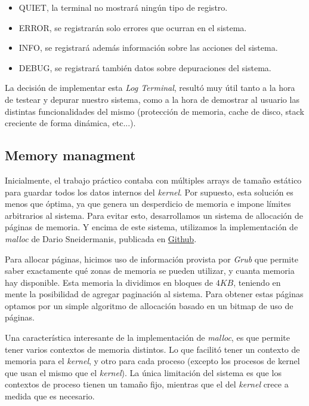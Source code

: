 \documentclass[a4paper,10pt]{article}
\begin{document}
        \begin{itemize}
        \item QUIET, la terminal no mostrará ningún tipo de registro.
        \item ERROR, se registrarán solo errores que ocurran en el sistema.
        \item INFO, se registrará además información sobre las acciones del sistema.
        \item DEBUG, se registrará también datos sobre depuraciones del sistema.
        \end{itemize}

        La decisión de implementar esta \textit{Log Terminal}, resultó muy útil tanto a la hora de testear y depurar nuestro sistema, como a la hora de demostrar al 
        usuario las distintas funcionalidades del mismo (protección de memoria, cache de disco, stack creciente de forma dinámica, etc...).\\


        \subsection{Memory managment}
        Inicialmente, el trabajo práctico contaba con múltiples arrays de tamaño estático para guardar todos los datos internos del \textit{kernel}.
        Por supuesto, esta solución es menos que óptima, ya que genera un desperdicio de memoria e impone límites arbitrarios al sistema.
        Para evitar esto, desarrollamos un sistema de allocación de páginas de memoria.
        Y encima de este sistema, utilizamos la implementación de \textit{malloc} de Dario Sneidermanis, publicada en \href{https://github.com/esneider/malloc}{Github}.

        Para allocar páginas, hicimos uso de información provista por \textit{Grub} que permite saber exactamente qué zonas de memoria se pueden utilizar, 
        y cuanta memoria hay disponible.
        Esta memoria la dividimos en bloques de $4KB$, teniendo en mente la posibilidad de agregar paginación al sistema.
        Para obtener estas páginas optamos por un simple algoritmo de allocación basado en un bitmap de uso de páginas.

        Una característica interesante de la implementación de \textit{malloc}, es que permite tener varios contextos de memoria distintos.
        Lo que facilitó tener un contexto de memoria para el \textit{kernel}, y otro para cada proceso (excepto los procesos de kernel que usan el mismo 
        que el \textit{kernel}).
        La única limitación del sistema es que los contextos de proceso tienen un tamaño fijo, mientras que el del  \textit{kernel} crece a medida que es necesario.\\
\end{document}
